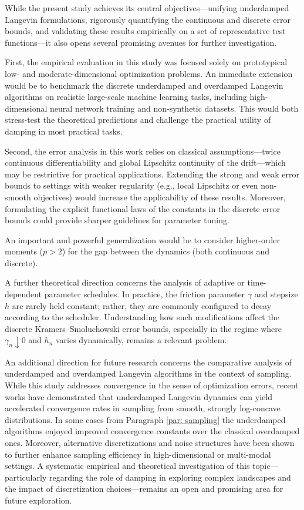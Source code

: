 \documentclass[12pt]{article}
\begin{document}
While the present study achieves its central objectives---unifying underdamped Langevin formulations, rigorously quantifying the continuous and discrete error bounds, and validating these results empirically on a set of representative test functions---it also opens several promising avenues for further investigation.

First, the empirical evaluation in this study was focused solely on prototypical low- and moderate-dimensional optimization problems. An immediate extension would be to benchmark the discrete underdamped and overdamped Langevin algorithms on realistic large-scale machine learning tasks, including high-dimensional neural network training and non-synthetic datasets. This would both stress-test the theoretical predictions and challenge the practical utility of damping in most practical tasks.

Second, the error analysis in this work relies on classical assumptions---twice continuous differentiability and global Lipschitz continuity of the drift---which may be restrictive for practical applications.
Extending the strong and weak error bounds to settings with weaker regularity (e.g., local Lipschitz or even non-smooth objectives) would increase the applicability of these results. Moreover, formulating the explicit functional laws of the constants in the discrete error bounds could provide sharper guidelines for parameter tuning.

An important and powerful generalization would be to consider higher-order moments ($p>2$) for the gap between the dynamics (both continuous and discrete).

A further theoretical direction concerns the analysis of adaptive or time-dependent parameter schedules.
In practice, the friction parameter $\gamma$ and stepsize $h$ are rarely held constant; rather, they are commonly configured to decay according to the scheduler.
Understanding how such modifications affect the discrete Kramers--Smoluchowski error bounds, especially in the regime where $\gamma_n \downarrow 0$ and $h_n$ varies dynamically, remains a relevant problem.

An additional direction for future research concerns the comparative analysis of underdamped and overdamped Langevin algorithms in the context of sampling.
While this study addresses convergence in the sense of optimization errors, recent works have demonstrated that underdamped Langevin dynamics can yield accelerated convergence rates in sampling from smooth, strongly log-concave distributions.
In some cases from Paragraph \ref{par: sampling} the underdamped algorithms enjoyed improved convergence constants over the classical overdamped ones.
Moreover, alternative discretizations and noise structures have been shown to further enhance sampling efficiency in high-dimensional or multi-modal settings.
A systematic empirical and theoretical investigation of this topic---particularly regarding the role of damping in exploring complex landscapes and the impact of discretization choices---remains an open and promising area for future exploration.\\
\end{document}
